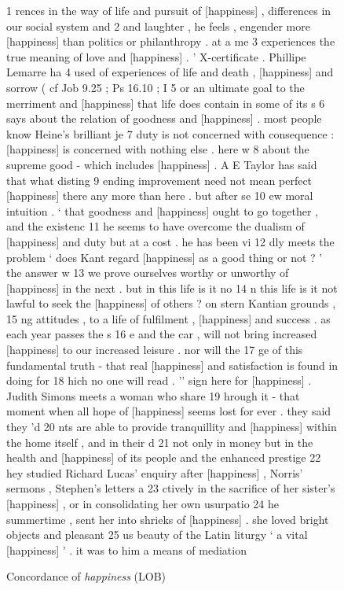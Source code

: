 \begin{figure}
\caption{Concordance of \textit{happiness} (LOB)}
\label{fig:happinesslobconc}
\hrulefill
\vspace{-\baselineskip}
\begin{fitverb}
 1 rences in the way of life and pursuit of [happiness] , differences in our social system and
 2  and laughter , he feels , engender more [happiness] than politics or philanthropy . at a me
 3 experiences the true meaning of love and [happiness] . ' X-certificate . Phillipe Lemarre ha
 4  used of experiences of life and death , [happiness] and sorrow ( cf Job 9.25 ; Ps 16.10 ; I
 5 or an ultimate goal to the merriment and [happiness] that life does contain in some of its s
 6  says about the relation of goodness and [happiness] . most people know Heine's brilliant je
 7 duty is not concerned with consequence : [happiness] is concerned with nothing else . here w
 8  about the supreme good - which includes [happiness] . A E Taylor has said that what disting
 9 ending improvement need not mean perfect [happiness] there any more than here . but after se
10 ew moral intuition . ` that goodness and [happiness] ought to go together , and the existenc
11 he seems to have overcome the dualism of [happiness] and duty but at a cost . he has been vi
12 dly meets the problem ` does Kant regard [happiness] as a good thing or not ? ' the answer w
13 we prove ourselves worthy or unworthy of [happiness] in the next . but in this life is it no
14 n this life is it not lawful to seek the [happiness] of others ? on stern Kantian grounds ,
15 ng attitudes , to a life of fulfilment , [happiness] and success . as each year passes the s
16 e and the car , will not bring increased [happiness] to our increased leisure . nor will the
17 ge of this fundamental truth - that real [happiness] and satisfaction is found in doing for
18 hich no one will read . '' sign here for [happiness] . Judith Simons meets a woman who share
19 hrough it - that moment when all hope of [happiness] seems lost for ever . they said they 'd
20 nts are able to provide tranquillity and [happiness] within the home itself , and in their d
21  not only in money but in the health and [happiness] of its people and the enhanced prestige
22 hey studied Richard Lucas' enquiry after [happiness] , Norris' sermons , Stephen's letters a
23 ctively in the sacrifice of her sister's [happiness] , or in consolidating her own usurpatio
24 he summertime , sent her into shrieks of [happiness] . she loved bright objects and pleasant
25 us beauty of the Latin liturgy ` a vital [happiness] ' . it was to him a means of mediation

\end{fitverb}
\end{figure}
